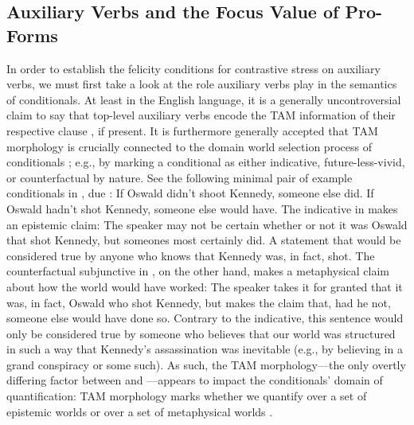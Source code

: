 \subsection{Auxiliary Verbs and the Focus Value of Pro-Forms}
In order to establish the felicity conditions for contrastive stress on auxiliary verbs, we must first take a look at the role auxiliary verbs play in the semantics of conditionals. At least in the English language, it is a generally uncontroversial claim to say that top-level auxiliary verbs encode the TAM information of their respective clause \parencites{Chomsky1957}{Akmajian1979}[amongst others]{Klein1994}, if present. It is furthermore generally accepted that TAM morphology is crucially connected to the domain world selection process of conditionals \parencites{Palmer1986}{Iatridou2000}{Arregui2009}{Romero2014}{Schulz2014}; e.g., by marking a conditional as either indicative, future-less-vivid, or counterfactual by nature. See the following minimal pair of example conditionals in , due \textcite[p.~90]{Adams1970}:
\pex\label{ex:kennedy}
\a If Oswald didn't shoot Kennedy, someone else did.
\a If Oswald hadn't shot Kennedy, someone else would have.
\xe
The indicative in  makes an epistemic claim: The speaker may not be certain whether or not it was Oswald that shot Kennedy, but someones most certainly did. A statement that would be considered true by anyone who knows that Kennedy was, in fact, shot. The counterfactual subjunctive in , on the other hand, makes a metaphysical claim about how the world would have worked: The speaker takes it for granted that it was, in fact, Oswald who shot Kennedy, but makes the claim that, had he not, someone else would have done so. Contrary to the indicative, this sentence would only be considered true by someone who believes that our world was structured in such a way that Kennedy's assassination was inevitable (e.g., by believing in a grand conspiracy or some such). As such, the TAM morphology---the only overtly differing factor between  and ---appears to impact the conditionals' domain of quantification: TAM morphology marks whether we quantify over a set of epistemic worlds or over a set of metaphysical worlds \parencite[see, amongst others,][p.~62]{Condoravdi2002}.


